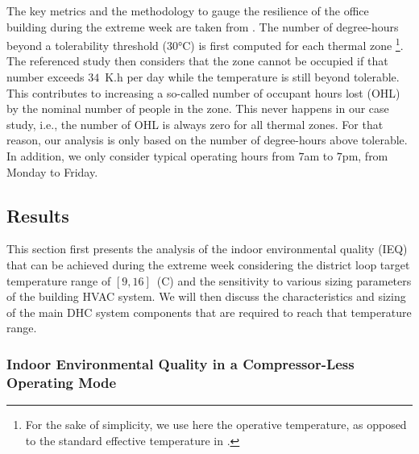 The key metrics and the methodology to gauge the resilience of the office building during the extreme week are taken from \cite{Mathew2021}.
The number of degree-hours beyond a tolerability threshold ($30$°C) is first computed for each thermal zone%
\footnote{For the sake of simplicity, we use here the operative temperature, as opposed to the standard effective temperature in \cite{Mathew2021}.}.
The referenced study then considers that the zone cannot be occupied if that number exceeds $34$~K.h per day while the temperature is still beyond tolerable. This contributes to increasing a so-called number of occupant hours lost (OHL) by the nominal number of people in the zone.
This never happens in our case study, i.e., the number of OHL is always zero for all thermal zones.
For that reason, our analysis is only based on the number of degree-hours above tolerable. In addition, we only consider typical operating hours from $7$am to $7$pm, from Monday to Friday.


\subsection{Results} \label{sec:results}

This section first presents the analysis of the indoor environmental quality (IEQ) that can be achieved during the extreme week considering the district loop target temperature range of $[9, 16]$~(C) and the sensitivity to various sizing parameters of the building HVAC system.
We will then discuss the characteristics and sizing of the main DHC system components that are required to reach that temperature range.


\subsubsection{Indoor Environmental Quality in a Compressor-Less Operating Mode} \label{sec:ieq}

